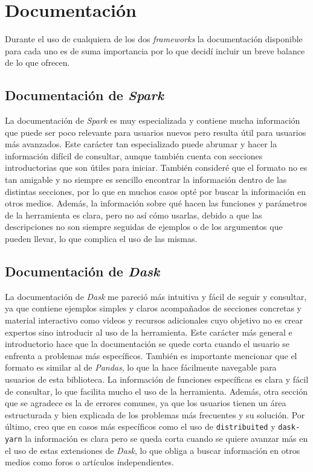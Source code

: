 \section{Documentación}

Durante el uso de cualquiera de los dos \textit{frameworks} la documentación disponible para cada uno es de suma importancia por lo que decidí incluir un breve balance de lo que ofrecen.

\subsection{Documentación de \textit{Spark}}

La documentación de \textit{Spark} es muy especializada y contiene mucha información que puede ser poco relevante para usuarios nuevos pero resulta útil para usuarios más avanzados. Este carácter tan especializado puede abrumar y hacer la información difícil de consultar, aunque también cuenta con secciones introductorias que son útiles para iniciar. También consideré que el formato no es tan amigable y no siempre es sencillo encontrar la información dentro de las distintas secciones, por lo que en muchos casos opté por buscar la información en otros medios. Además, la información sobre qué hacen las funciones y parámetros de la herramienta es clara, pero no así cómo usarlas, debido a que las descripciones no son siempre seguidas de ejemplos o de los argumentos que pueden llevar, lo que complica el uso de las mismas.

\subsection{Documentación de \textit{Dask}}

La documentación de \textit{Dask} me pareció más intuitiva y fácil de seguir y consultar, ya que contiene ejemplos simples y claros acompañados de secciones concretas y material interactivo como videos y recursos adicionales cuyo objetivo no es crear expertos sino introducir al uso de la herramienta. Este carácter más general e introductorio hace que la documentación se quede corta cuando el usuario se enfrenta a problemas más específicos. También es importante mencionar que el formato es similar al de \textit{Pandas}, lo que la hace fácilmente navegable para usuarios de esta biblioteca.
La información de funciones específicas es clara y fácil de consultar, lo que facilita mucho el uso de la herramienta. Además, otra sección que se agradece es la de errores comunes, ya que los usuarios tienen un área estructurada y bien explicada de los problemas más frecuentes y su solución. Por último, creo que en casos más específicos como el uso de \texttt{distribuited} y \texttt{dask-yarn} la información es clara pero se queda corta cuando se quiere avanzar más en el uso de estas extensiones de \textit{Dask}, lo que obliga a buscar información en otros medios como foros o artículos independientes.


